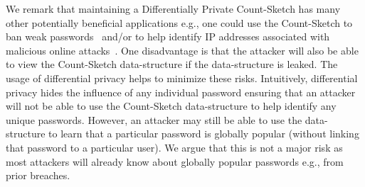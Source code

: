 
We remark that maintaining a Differentially Private Count-Sketch has many other potentially beneficial applications e.g., one could use the Count-Sketch to ban weak passwords~\cite{HTS:SchHerMit10} and/or to help identify IP addresses associated with malicious online attacks~\cite{EuroSP:THS19}. One disadvantage is that the attacker will also be able to view the Count-Sketch data-structure if the data-structure is leaked. The usage of differential privacy helps to minimize these risks. Intuitively, differential privacy hides the influence of any individual password ensuring that an attacker will not be able to use the Count-Sketch data-structure to help identify any unique passwords. However, an attacker may still be able to use the data-structure to learn that a particular password is globally popular (without linking that password to a particular user). We argue that this is not a major risk as most attackers will already know about globally popular passwords e.g., from prior breaches. 


